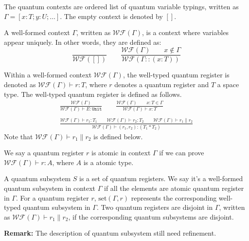 \begin{definition}
  The quantum contexts are ordered list of quantum variable typings, written as $\Gamma = [x : T; y : U; \dots]$. The empty context is denoted by $[]$.
\end{definition}

\begin{definition}
  A well-formed context $\Gamma$, written as $\mathcal{WF}(\Gamma)$, is a context where variables appear uniquely. In other words, they are defined as:
  $$
  \frac{}{\mathcal{WF}([])}
  \qquad
  \frac{\mathcal{WF}(\Gamma)\qquad x \notin \Gamma}{\mathcal{WF}(\Gamma :: (x : T))}
  $$
\end{definition}


\begin{definition}
  Within a well-formed context $\mathcal{WF}(\Gamma)$, the well-typed quantum register is denoted as $\mathcal{WF}(\Gamma) \vdash r : T$, where $r$ denotes a quantum register and $T$ a space type. The well-typed quantum register is defined as follows.
  \begin{gather*}
  \frac{\mathcal{WF}(\Gamma)}{\mathcal{WF}(\Gamma) \vdash E : \texttt{Unit}}
  \qquad
  \frac{\mathcal{WF}(\Gamma)\qquad x:T \in \Gamma}{\mathcal{WF}(\Gamma) \vdash x : T}\\
  \ \\  
  \frac{\mathcal{WF}(\Gamma) \vdash r_1 : T_1 \qquad \mathcal{WF}(\Gamma) \vdash r_2 : T_2\qquad \mathcal{WF}(\Gamma) \vdash r_1 \| r_2}{\mathcal{WF}(\Gamma) \vdash (r_1, r_2) : (T_1 * T_2) }
  \end{gather*}
  Note that $\mathcal{WF}(\Gamma) \vdash r_1 \| r_2$ is defined below.
\end{definition}


\begin{definition}
  We say a quantum register $r$ is atomic in context $\Gamma$ if we can prove
  $\mathcal{WF}(\Gamma) \vdash r : A$, where $A$ is a atomic type.
\end{definition}

\begin{definition}
  A quantum subsystem $S$ is a set of quantum registers. 
  We say it's a well-formed quantum subsystem in context $\Gamma$ if all the elements are atomic quantum register in $\Gamma$. 
  For a quantum register $r$, $\mathrm{set}(\Gamma, r)$ represents the corresponding well-typed quantum subsystem in $\Gamma$.
  Two quantum registers are disjoint in $\Gamma$, written as $\mathcal{WF}(\Gamma) \vdash r_1 \| r_2$, if the corresponding quantum subsystems are disjoint.
\end{definition}
\textbf{Remark:} The description of quantum subsystem still need refinement.

